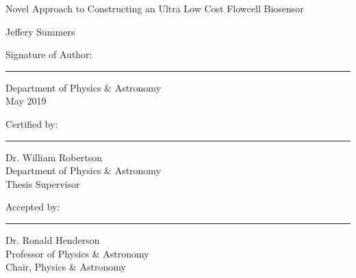 \documentclass{article}%
\begin{document}
\begin{center}
{\selectfont
    Novel Approach to Constructing an Ultra Low Cost Flowcell Biosensor\\
}
\vspace{1.8cm}

{\selectfont
Jeffery Summers
}
\vspace{8.4cm}
\end{center}
\begin{flushleft}
    {\selectfont
    Signature of Author:\\
    }
\end{flushleft}
\vspace{0cm}
\hrule
\begin{flushright}
    {\small\selectfont
    Department of Physics \& Astronomy\\
    May 2019\\
    }
\end{flushright}
\vspace{2cm}
\begin{flushleft}
    {\selectfont
    Certified by:\\
    }
\end{flushleft}
\vspace{0cm}
\hrule
\begin{flushright}
    {\small\selectfont
    Dr. William Robertson\\
    Department of Physics \& Astronomy\\
    Thesis Supervisor\\
    }
\end{flushright}
\vspace{2cm}
\begin{flushleft}
    {\selectfont
    Accepted by:\\
    }
\end{flushleft}
\vspace{0cm}
\hrule
\begin{flushright}
    {\small\selectfont
    Dr. Ronald Henderson\\
    Professor of Physics \& Astronomy\\
    Chair, Physics \& Astronomy\\
    }
\end{flushright}
\vspace{2cm}
\end{document}
